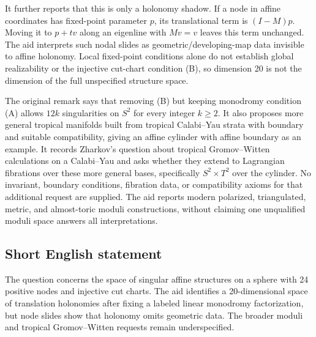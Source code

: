 \documentclass[11pt]{article}
\begin{document}
It further reports that this is only a holonomy shadow. If a node in affine coordinates has fixed-point parameter \(p\), its translational term is \((I-M)p\). Moving it to \(p+tv\) along an eigenline with \(Mv=v\) leaves this term unchanged. The aid interprets such nodal slides as geometric/developing-map data invisible to affine holonomy. Local fixed-point conditions alone do not establish global realizability or the injective cut-chart condition (B), so dimension 20 is not the dimension of the full unspecified structure space.

The original remark says that removing (B) but keeping monodromy condition (A) allows \(12k\) singularities on \(S^2\) for every integer \(k\ge2\). It also proposes more general tropical manifolds built from tropical Calabi--Yau strata with boundary and suitable compatibility, giving an affine cylinder with affine boundary as an example. It records Zharkov's question about tropical Gromov--Witten calculations on a Calabi--Yau and asks whether they extend to Lagrangian fibrations over these more general bases, specifically \(S^2\times T^2\) over the cylinder. No invariant, boundary conditions, fibration data, or compatibility axioms for that additional request are supplied. The aid reports modern polarized, triangulated, metric, and almost-toric moduli constructions, without claiming one unqualified moduli space answers all interpretations.
\subsection{Short English statement}
The question concerns the space of singular affine structures on a sphere with 24 positive nodes and injective cut charts. The aid identifies a 20-dimensional space of translation holonomies after fixing a labeled linear monodromy factorization, but node slides show that holonomy omits geometric data. The broader moduli and tropical Gromov--Witten requests remain underspecified.
\end{document}
